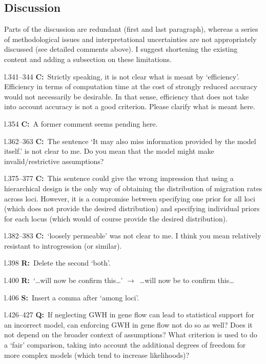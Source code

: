 \documentclass[11pt]{article}
\newenvironment{my_description}
{\begin{description}
  \setlength{\itemsep}{2pt}
  \setlength{\parskip}{0pt}
  \setlength{\parsep}{0pt}}
{\end{description}}
\newcommand{\ra}{$\rightarrow$\ }
\newcommand{\C}{\textbf{C:}\ }
\newcommand{\Q}{\textbf{Q:}\ }
\newcommand{\R}{\textbf{R:}\ }
\newcommand{\V}{\textbf{S:}\ }
\begin{document}
\subsection{Discussion}
Parts of the discussion are redundant (first and last paragraph), whereas a series of methodological issues and interpretational uncertainties are not appropriately discussed (see detailed comments above). I suggest shortening the existing content and adding a subsection on these limitations.
\begin{my_description}
	\item[l.341--344] \C Strictly speaking, it is not clear what is meant by `efficiency'. Efficiency in terms of computation time at the cost of strongly reduced accuracy would not necessarily be desirable. In that sense, efficiency that does not take into account accuracy is not a good criterion. Please clarify what is meant here.
	\item[l.354] \C A former comment seems pending here.
	\item[l.362--363] \C The sentence `It may also miss information provided by the model itself.' is not clear to me. Do you mean that the model might make invalid/restrictive assumptions?
	\item[l.375--377] \C This sentence could give the wrong impression that using a hierarchical design is the only way of obtaining the distribution of migration rates across loci. However, it is a compromise between specifying one prior for all loci (which does not provide the desired distribution) and specifying individual priors for each locus (which would of course provide the desired distribution).
	\item[l.382--383] \C `loosely permeable' was not clear to me. I think you mean relatively resistant to introgression (or similar).
	\item[l.398] \R Delete the second `both'.
	\item[l.400] \R `\dots will now be confirm this\dots' \ra \dots will now be to confirm this\dots
	\item[l.406] \V Insert a comma after `among loci'.
	\item[l.426--427] \Q If neglecting GWH in gene flow can lead to statistical support for an incorrect model, can enforcing GWH in gene flow not do so as well? Does it not depend on the broader context of assumptions? What criterion is used to do a `fair' comparison, taking into account the additional degrees of freedom for more complex models (which tend to increase likelihoods)?
\end{my_description}
	
\end{document}
